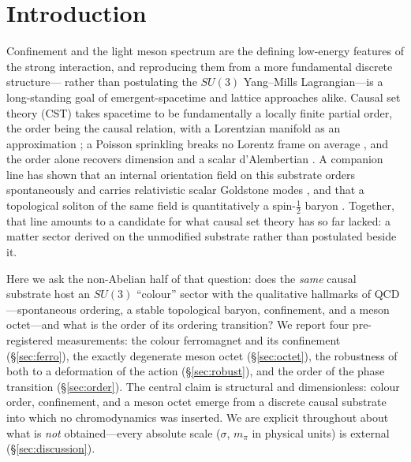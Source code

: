 \documentclass[aps,prd,reprint,nofootinbib,superscriptaddress,floatfix]{revtex4-2}
\begin{document}
\maketitle

\section{Introduction}\label{sec:intro}

Confinement and the light meson spectrum are the defining low-energy features of the
strong interaction, and reproducing them from a more fundamental discrete structure---
rather than postulating the $SU(3)$ Yang--Mills Lagrangian---is a long-standing goal of
emergent-spacetime and lattice approaches alike. Causal set theory (CST) takes spacetime
to be fundamentally a locally finite partial order, the order being the causal relation,
with a Lorentzian manifold as an approximation \cite{BLMS1987}; a Poisson sprinkling
breaks no Lorentz frame on average \cite{BombelliHensonSorkin2009}, and the order alone
recovers dimension and a scalar d'Alembertian \cite{Myrheim1978,Surya2019}. A companion
line has shown that an internal orientation field on this substrate orders spontaneously
and carries relativistic scalar Goldstone modes \cite{GoldstonePRD}, and that a
topological soliton of the same field is quantitatively a spin-$\tfrac12$ baryon
\cite{MatterGravityPRD}. Together, that line amounts to a candidate for what causal
set theory has so far lacked: a matter sector derived on the unmodified substrate
rather than postulated beside it.

Here we ask the non-Abelian half of that question: does the \emph{same} causal substrate host an
$SU(3)$ ``colour'' sector with the qualitative hallmarks of QCD---spontaneous ordering,
a stable topological baryon, confinement, and a meson octet---and what is the order of
its ordering transition? We report four pre-registered measurements: the colour
ferromagnet and its confinement (\S\ref{sec:ferro}), the exactly degenerate meson octet
(\S\ref{sec:octet}), the robustness of both to a deformation of the action
(\S\ref{sec:robust}), and the order of the phase transition (\S\ref{sec:order}). The
central claim is structural and dimensionless: colour order, confinement, and a meson
octet emerge from a discrete causal substrate into which no chromodynamics was inserted.
We are explicit throughout about what is \emph{not} obtained---every absolute scale
($\sigma$, $m_\pi$ in physical units) is external (\S\ref{sec:discussion}).
\end{document}
